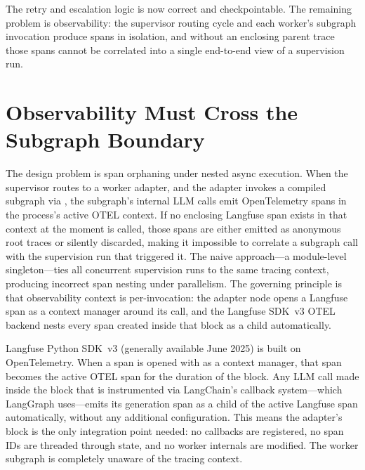 The retry and escalation logic is now correct and checkpointable. The
remaining problem is observability: the supervisor routing cycle and each
worker's subgraph invocation produce spans in isolation, and without an
enclosing parent trace those spans cannot be correlated into a single
end-to-end view of a supervision run.


\section{Observability Must Cross the Subgraph Boundary}
\label{sec:sup-langfuse}

The design problem is span orphaning under nested async execution. When the
supervisor routes to a worker adapter, and the adapter invokes a compiled
subgraph via , the subgraph's internal LLM calls emit
OpenTelemetry spans in the process's active OTEL context. If no enclosing
Langfuse span exists in that context at the moment  is
called, those spans are either emitted as anonymous root traces or silently
discarded, making it impossible to correlate a subgraph call with the
supervision run that triggered it. The naive approach---a module-level
 singleton---ties all concurrent supervision runs to the
same tracing context, producing incorrect span nesting under parallelism.
The governing principle is that observability context is per-invocation:
the adapter node opens a Langfuse span as a context manager around its
 call, and the Langfuse SDK~v3 OTEL backend nests every span
created inside that block as a child automatically.

Langfuse Python SDK~v3 (generally available June 2025) is built on
OpenTelemetry. When a span is opened with
 as a context manager, that span
becomes the active OTEL span for the duration of the  block.
Any LLM call made inside the block that is instrumented via
LangChain's callback system---which LangGraph uses---emits its generation
span as a child of the active Langfuse span automatically, without any
additional configuration. This means the adapter's 
block is the only integration point needed: no callbacks are registered,
no span IDs are threaded through state, and no worker internals are
modified. The worker subgraph is completely unaware of the tracing context.

